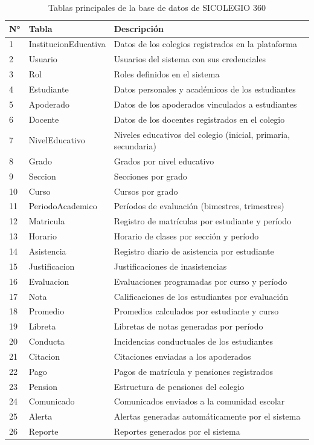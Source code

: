 \documentclass[12pt,a4paper,oneside]{report}
\begin{document}
\begin{table}[H]
\centering
\caption{Tablas principales de la base de datos de SICOLEGIO 360}
\label{tab:tablas}
\begin{tabularx}{\textwidth}{llX}
\toprule
N° & Tabla & Descripción \\
\midrule
1 & InstitucionEducativa & Datos de los colegios registrados en la plataforma \\
2 & Usuario & Usuarios del sistema con sus credenciales \\
3 & Rol & Roles definidos en el sistema \\
4 & Estudiante & Datos personales y académicos de los estudiantes \\
5 & Apoderado & Datos de los apoderados vinculados a estudiantes \\
6 & Docente & Datos de los docentes registrados en el colegio \\
7 & NivelEducativo & Niveles educativos del colegio (inicial, primaria, secundaria) \\
8 & Grado & Grados por nivel educativo \\
9 & Seccion & Secciones por grado \\
10 & Curso & Cursos por grado \\
11 & PeriodoAcademico & Períodos de evaluación (bimestres, trimestres) \\
12 & Matricula & Registro de matrículas por estudiante y período \\
13 & Horario & Horario de clases por sección y período \\
14 & Asistencia & Registro diario de asistencia por estudiante \\
15 & Justificacion & Justificaciones de inasistencias \\
16 & Evaluacion & Evaluaciones programadas por curso y período \\
17 & Nota & Calificaciones de los estudiantes por evaluación \\
18 & Promedio & Promedios calculados por estudiante y curso \\
19 & Libreta & Libretas de notas generadas por período \\
20 & Conducta & Incidencias conductuales de los estudiantes \\
21 & Citacion & Citaciones enviadas a los apoderados \\
22 & Pago & Pagos de matrícula y pensiones registrados \\
23 & Pension & Estructura de pensiones del colegio \\
24 & Comunicado & Comunicados enviados a la comunidad escolar \\
25 & Alerta & Alertas generadas automáticamente por el sistema \\
26 & Reporte & Reportes generados por el sistema \\
\bottomrule
\end{tabularx}
\end{table}
\end{document}
